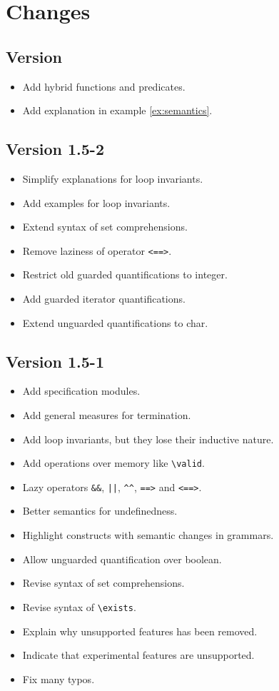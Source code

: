 \section{Changes}

\subsection{Version \version}

\begin{itemize}
\item Add hybrid functions and predicates.
\item Add explanation in example \ref{ex:semantics}.
\end{itemize}

\subsection{Version 1.5-2}

\begin{itemize}
\item Simplify explanations for loop invariants.
\item Add examples for loop invariants.
\item Extend syntax of set comprehensions.
\item Remove laziness of operator \lstinline|<==>|.
\item Restrict old guarded quantifications to integer.
\item Add guarded iterator quantifications.
\item Extend unguarded quantifications to char.
\end{itemize}

\subsection{Version 1.5-1}

\begin{itemize}
\item Add specification modules.
\item Add general measures for termination.
\item Add loop invariants, but they lose their inductive \acsl nature.
\item Add operations over memory like \lstinline|\valid|.
\item Lazy operators \lstinline|&&|, \lstinline+||+, \lstinline|^^|,
  \lstinline|==>| and \lstinline|<==>|.
\item Better semantics for undefinedness.
\item Highlight constructs with semantic changes in grammars.
\item Allow unguarded quantification over boolean.
\item Revise syntax of set comprehensions.
\item Revise syntax of \lstinline|\exists|.
\item Explain why unsupported features has been removed.
\item Indicate that experimental \acsl features are unsupported.
\item Fix many typos.
\end{itemize}

